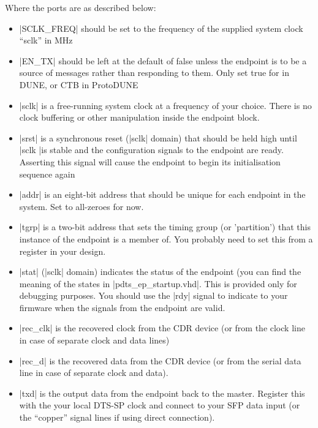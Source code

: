\documentclass{dune}
\begin{document}
Where the ports are as described below:

\begin{itemize}
    

\item |SCLK_FREQ| should be set to the frequency of the supplied system clock ``sclk'' in MHz

\item |EN_TX| should be left at the default of false unless the endpoint is to be a source of messages rather than responding to them. Only set true for  in DUNE, or CTB in ProtoDUNE

\item |sclk| is a free-running system clock at a frequency of your choice. There is no clock
buffering or other manipulation inside the endpoint block.

\item |srst| is a synchronous reset (|sclk| domain) that should be held high until |sclk |is stable
and the configuration signals to the endpoint are ready. Asserting this signal will cause
the endpoint to begin its initialisation sequence again

\item |addr| is an eight-bit address that should be unique for each endpoint in the system.
Set to all-zeroes for now.

\item |tgrp| is a two-bit address that sets the timing group (or 'partition') that this instance
of the endpoint is a member of. You probably need to set this from a register in your
design.

\item |stat| (|sclk| domain) indicates the status of the endpoint (you can find the meaning of the states
in |pdts_ep_startup.vhd|. This is provided only for debugging purposes. You should use the
|rdy| signal to indicate to your firmware when the signals from the endpoint are valid.

\item |rec_clk| is the recovered clock from the CDR device (or from the clock line in case of separate clock and data lines)

\item |rec_d| is the recovered data from the CDR device (or from the serial data line in case of separate clock and data).

\item |txd| is the output data from the endpoint back to the master. Register this with the your local DTS-SP clock and connect to your
SFP data input (or the ``copper'' signal lines if using direct connection).


\end{itemize}
\end{document}
